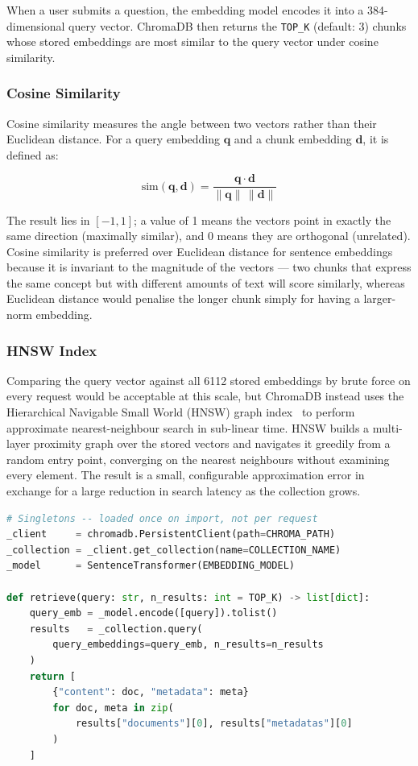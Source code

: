 When a user submits a question, the embedding model encodes it into a 384-dimensional query vector. ChromaDB then returns the \texttt{TOP\_K} (default: 3) chunks whose stored embeddings are most similar to the query vector under cosine similarity.

\subsubsection*{Cosine Similarity}

Cosine similarity measures the angle between two vectors rather than their Euclidean distance. For a query embedding $\mathbf{q}$ and a chunk embedding $\mathbf{d}$, it is defined as:

\begin{equation}
\text{sim}(\mathbf{q}, \mathbf{d}) = \frac{\mathbf{q} \cdot \mathbf{d}}{\|\mathbf{q}\|\,\|\mathbf{d}\|}
\label{eq:cosine}
\end{equation}

The result lies in $[-1, 1]$; a value of 1 means the vectors point in exactly the same direction (maximally similar), and 0 means they are orthogonal (unrelated). Cosine similarity is preferred over Euclidean distance for sentence embeddings because it is invariant to the magnitude of the vectors — two chunks that express the same concept but with different amounts of text will score similarly, whereas Euclidean distance would penalise the longer chunk simply for having a larger-norm embedding.

\subsubsection*{HNSW Index}

Comparing the query vector against all 6112 stored embeddings by brute force on every request would be acceptable at this scale, but ChromaDB instead uses the Hierarchical Navigable Small World (HNSW) graph index~\cite{malkov2018hnsw} to perform approximate nearest-neighbour search in sub-linear time. HNSW builds a multi-layer proximity graph over the stored vectors and navigates it greedily from a random entry point, converging on the nearest neighbours without examining every element. The result is a small, configurable approximation error in exchange for a large reduction in search latency as the collection grows.

\begin{lstlisting}[language=Python]
# Singletons -- loaded once on import, not per request
_client     = chromadb.PersistentClient(path=CHROMA_PATH)
_collection = _client.get_collection(name=COLLECTION_NAME)
_model      = SentenceTransformer(EMBEDDING_MODEL)

def retrieve(query: str, n_results: int = TOP_K) -> list[dict]:
    query_emb = _model.encode([query]).tolist()
    results   = _collection.query(
        query_embeddings=query_emb, n_results=n_results
    )
    return [
        {"content": doc, "metadata": meta}
        for doc, meta in zip(
            results["documents"][0], results["metadatas"][0]
        )
    ]
\end{lstlisting}

